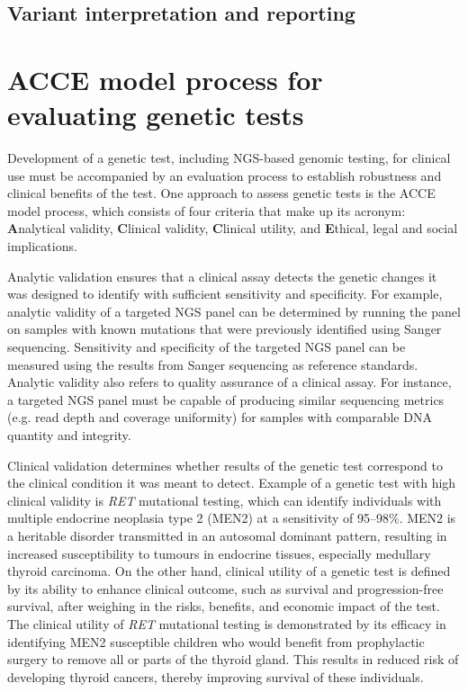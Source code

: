 \subsection{Variant interpretation and reporting}


\section{ACCE model process for evaluating genetic tests}
\label{sec:ACCEmodelprocessforevaluatinggenetictests}

Development of a genetic test, including NGS-based genomic testing, for clinical use must be accompanied by an evaluation process to establish robustness and clinical benefits of the test. One approach to assess genetic tests is the ACCE model process, which consists of four criteria that make up its acronym: \textbf{A}nalytical validity, \textbf{C}linical validity, \textbf{C}linical utility, and \textbf{E}thical, legal and social implications.

Analytic validation ensures that a clinical assay detects the genetic changes it was designed to identify with sufficient sensitivity and specificity. For example, analytic validity of a targeted NGS panel can be determined by running the panel on samples with known mutations that were previously identified using Sanger sequencing. Sensitivity and specificity of the targeted NGS panel can be measured using the results from Sanger sequencing as reference standards. Analytic validity also refers to quality assurance of a clinical assay. For instance, a targeted NGS panel must be capable of producing similar sequencing metrics (e.g. read depth and coverage uniformity) for samples with comparable DNA quantity and integrity.

Clinical validation determines whether results of the genetic test correspond to the clinical condition it was meant to detect. Example of a genetic test with high clinical validity is \textit{RET} mutational testing, which can identify individuals with multiple endocrine neoplasia type 2 (MEN2) at a sensitivity of 95--98\%. MEN2 is a heritable disorder transmitted in an autosomal dominant pattern, resulting in increased susceptibility to tumours in endocrine tissues, especially medullary thyroid carcinoma. On the other hand, clinical utility of a genetic test is defined by its ability to enhance clinical outcome, such as survival and progression-free survival, after weighing in the risks, benefits, and economic impact of the test. The clinical utility of \textit{RET} mutational testing is demonstrated by its efficacy in identifying MEN2 susceptible children who would benefit from prophylactic surgery to remove all or parts of the thyroid gland. This results in reduced risk of developing thyroid cancers, thereby improving survival of these individuals.

